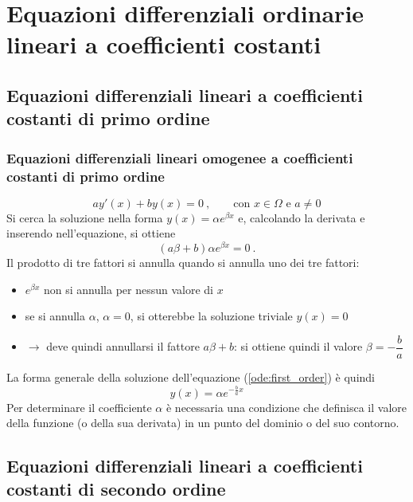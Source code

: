 \chapter{Equazioni differenziali ordinarie lineari a coefficienti costanti}

\section{Equazioni differenziali lineari a coefficienti costanti di primo ordine}
\subsection{Equazioni differenziali lineari omogenee a coefficienti costanti di primo ordine}
\begin{equation}\label{ode:first_order}
  a y'(x) + b y(x) = 0 \ , \qquad \text{con $x \in \Omega$ e  $a \ne 0$}
\end{equation}
Si cerca la soluzione nella forma $y(x) = \alpha e^{\beta x}$ e, calcolando la derivata e inserendo nell'equazione, si ottiene
\begin{equation}
  ( a \beta + b ) \alpha e^{\beta x} = 0 \ .
\end{equation}
Il prodotto di tre fattori si annulla quando si annulla uno dei tre fattori:
\begin{itemize}
    \item $e^{\beta x}$ non si annulla per nessun valore di $x$
    \item se si annulla $\alpha$, $\alpha = 0$, si otterebbe la soluzione triviale $y(x) = 0$
    \item $\rightarrow$ deve quindi annullarsi il fattore $a \beta + b$: si ottiene quindi il valore $\beta = -\dfrac{b}{a}$
\end{itemize}
La forma generale della soluzione dell'equazione (\ref{ode:first_order}) è quindi
\begin{equation}
  y(x) = \alpha e^{-\frac{b}{a}x}
\end{equation}
Per determinare il coefficiente $\alpha$ è necessaria una condizione che definisca il valore della funzione (o della sua derivata) in un punto del dominio o del suo contorno. 

\section{Equazioni differenziali lineari a coefficienti costanti di secondo ordine}
